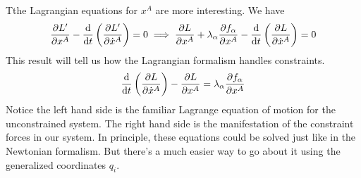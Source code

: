 \documentclass[11pt, a4paper]{article}
\begin{document}
\begin{itemize}
	Tthe Lagrangian equations for $ x^{A} $ are more interesting. We have
	\begin{equation*}
		\pdv{L'}{x^{A}} - \dv{}{t}\left(\pdv{L'}{\dot{x}^{A}} \right) = 0 \implies \pdv{L}{x^{A}} + \lambda_{\alpha} \pdv{f_{\alpha}}{x^{A}} -  \dv{}{t}\left(\pdv{L}{\dot{x}^{A}} \right) = 0
	\end{equation*}
	This result will tell us how the Lagrangian formalism handles constraints.
	\begin{equation*}
		 \dv{}{t}\left(\pdv{L}{\dot{x}^{A}} \right) - \pdv{L}{x^{A}} = \lambda_{\alpha} \pdv{f_{\alpha}}{x^{A}}
	\end{equation*}
	Notice the left hand side is the familiar Lagrange equation of motion for the unconstrained system. The right hand side is the manifestation of the constraint forces in our system. In principle, these equations could be solved just like in the Newtonian formalism. But there's a much easier way to go about it using the generalized coordinates $ q_{i} $.
	
\end{itemize}

	
\end{document}
